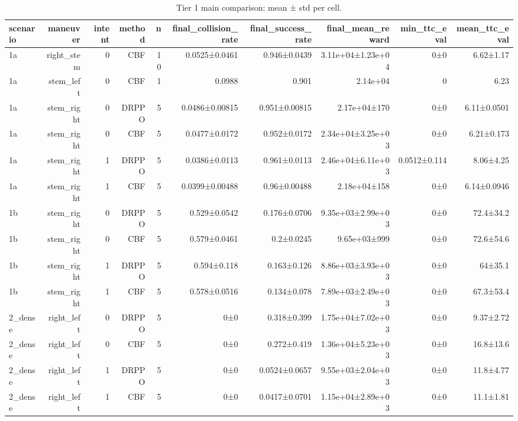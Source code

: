 \begin{table}[htbp]
\centering
\caption{Tier 1 main comparison: mean ± std per cell.}
\label{tab:tier1_main}
\begin{tabular}{lrrrrrrrrr}
\toprule
scenario & maneuver & intent & method & n & final\_collision\_rate & final\_success\_rate & final\_mean\_reward & min\_ttc\_eval & mean\_ttc\_eval \\
\midrule
1a & right\_stem & 0 & CBF & 10 & 0.0525±0.0461 & 0.946±0.0439 & 3.11e+04±1.23e+04 & 0±0 & 6.62±1.17 \\
1a & stem\_left & 0 & CBF & 1 & 0.0988 & 0.901 & 2.14e+04 & 0 & 6.23 \\
1a & stem\_right & 0 & DRPPO & 5 & 0.0486±0.00815 & 0.951±0.00815 & 2.17e+04±170 & 0±0 & 6.11±0.0501 \\
1a & stem\_right & 0 & CBF & 5 & 0.0477±0.0172 & 0.952±0.0172 & 2.34e+04±3.25e+03 & 0±0 & 6.21±0.173 \\
1a & stem\_right & 1 & DRPPO & 5 & 0.0386±0.0113 & 0.961±0.0113 & 2.46e+04±6.11e+03 & 0.0512±0.114 & 8.06±4.25 \\
1a & stem\_right & 1 & CBF & 5 & 0.0399±0.00488 & 0.96±0.00488 & 2.18e+04±158 & 0±0 & 6.14±0.0946 \\
1b & stem\_right & 0 & DRPPO & 5 & 0.529±0.0542 & 0.176±0.0706 & 9.35e+03±2.99e+03 & 0±0 & 72.4±34.2 \\
1b & stem\_right & 0 & CBF & 5 & 0.579±0.0461 & 0.2±0.0245 & 9.65e+03±999 & 0±0 & 72.6±54.6 \\
1b & stem\_right & 1 & DRPPO & 5 & 0.594±0.118 & 0.163±0.126 & 8.86e+03±3.93e+03 & 0±0 & 64±35.1 \\
1b & stem\_right & 1 & CBF & 5 & 0.578±0.0516 & 0.134±0.078 & 7.89e+03±2.49e+03 & 0±0 & 67.3±53.4 \\
2\_dense & right\_left & 0 & DRPPO & 5 & 0±0 & 0.318±0.399 & 1.75e+04±7.02e+03 & 0±0 & 9.37±2.72 \\
2\_dense & right\_left & 0 & CBF & 5 & 0±0 & 0.272±0.419 & 1.36e+04±5.23e+03 & 0±0 & 16.8±13.6 \\
2\_dense & right\_left & 1 & DRPPO & 5 & 0±0 & 0.0524±0.0657 & 9.55e+03±2.04e+03 & 0±0 & 11.8±4.77 \\
2\_dense & right\_left & 1 & CBF & 5 & 0±0 & 0.0417±0.0701 & 1.15e+04±2.89e+03 & 0±0 & 11.1±1.81 \\
\bottomrule
\end{tabular}
\end{table}
